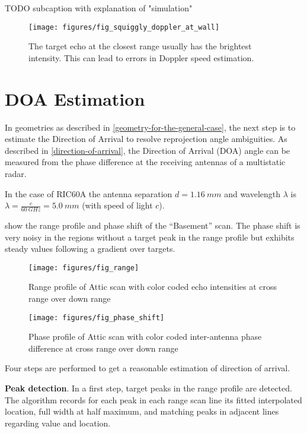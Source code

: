 TODO subcaption with explanation of "simulation"

\begin{figure}[htbp]
    \centering
    \texttt{[image: figures/fig\_squiggly\_doppler\_at\_wall]}
    \caption{The target echo at the closest range usually has the brightest intensity. This can lead to errors in Doppler speed estimation.}
    \label{fig:fig_squiggly_doppler_at_wall}
\end{figure}

\section{DOA Estimation}\label{doa-implementation}

In geometries as described in \cref{geometry-for-the-general-case}, the next step is to estimate the Direction of Arrival to resolve reprojection angle ambiguities.
As described in \cref{direction-of-arrival}, the Direction of Arrival (DOA) angle can be measured from the phase difference at the receiving antennas of a multistatic radar.

In the case of RIC60A the antenna separation \(d=\SI{1.16}{mm}\) and
wavelength \(\lambda\) is \(\lambda=\frac{c}{\SI{60}{GHz}}=\SI{5.0}{mm}\) (with speed
of light \(c\)).

 show the range profile and phase shift of the
``Basement'' scan. The phase shift is very noisy in the regions without
a target peak in the range profile but exhibits steady values following
a gradient over targets.

\begin{figure}[htbp]
    \centering
    \texttt{[image: figures/fig\_range]}
    \caption{Range profile of Attic scan with color coded echo intensities at cross range over down range}
    \label{fig:fig_range}
\end{figure}

\begin{figure}[htbp]
    \centering
    \texttt{[image: figures/fig\_phase\_shift]}
    \caption{Phase profile of Attic scan with color coded inter-antenna phase difference at cross range over down range}
    \label{fig:fig_phase_shift}
\end{figure}

Four steps are performed to get a reasonable estimation of direction of
arrival.

\textbf{Peak detection}. In a first step, target peaks in the
range profile are detected. The algorithm records for each peak in each
range scan line its fitted interpolated location, full width at half
maximum, and matching peaks in adjacent lines regarding value and
location.

